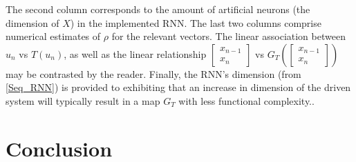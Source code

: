 \documentclass[a4paper,12pt,twoside]{report}
\begin{document}
\begin{center}
\begin{table}
{      The second column corresponds to the amount of artificial neurons (the dimension of $X$) in the implemented RNN.
      The last two columns comprise numerical estimates of $\rho$ for the relevant vectors. The linear association between $u_n$ vs $T(u_{n})$, as well as the linear relationship $\begin{bmatrix}
              x_{n-1}\\
              x_n
          \end{bmatrix}$ vs $G_T \left( \begin{bmatrix}
              x_{n-1}\\
              x_n
          \end{bmatrix}\right)$ may be contrasted by the reader. 
          Finally, the RNN's dimension (from \eqref{Seq_RNN}) is provided to exhibiting that an increase in dimension of the driven system will 
          typically result in a map $G_T$ with less functional complexity.}.
      \end{table}\label{tbl_attractorsPearson}
\end{center}

  

\chapter{Conclusion}\label{ch6}

  



\end{document}
